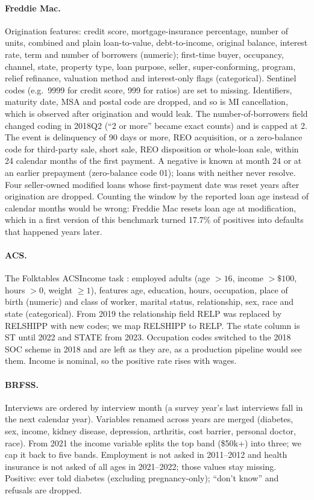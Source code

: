 \documentclass[11pt]{article}
\begin{document}
\paragraph{Freddie Mac.} Origination features: credit score, mortgage-insurance percentage, number
of units, combined and plain loan-to-value, debt-to-income, original balance, interest rate, term
and number of borrowers (numeric); first-time buyer, occupancy, channel, state, property type,
loan purpose, seller, super-conforming, program, relief refinance, valuation method and
interest-only flags (categorical). Sentinel codes (e.g.\ 9999 for credit score, 999 for ratios) are
set to missing. Identifiers, maturity date, MSA and postal code are dropped, and so is MI
cancellation, which is observed after origination and would leak. The number-of-borrowers field
changed coding in 2018Q2 (``2 or more'' became exact counts) and is capped at 2. The event is
delinquency of 90 days or more, REO acquisition, or a zero-balance code for third-party sale,
short sale, REO disposition or whole-loan sale, within 24 calendar months of the first payment.
A negative is known at month 24 or at an earlier prepayment (zero-balance code 01); loans with
neither never resolve. Four seller-owned modified loans whose first-payment date was reset years
after origination are dropped. Counting the window by the reported loan age instead of calendar
months would be wrong: Freddie Mac resets loan age at modification, which in a first version of
this benchmark turned 17.7\% of positives into defaults that happened years later.

\paragraph{ACS.} The Folktables ACSIncome task \citep{ding2021folktables}: employed adults (age
$> 16$, income $> \$100$, hours $> 0$, weight $\ge 1$), features age, education, hours, occupation,
place of birth (numeric) and class of worker, marital status, relationship, sex, race and state
(categorical). From 2019 the relationship field RELP was replaced by RELSHIPP with new codes; we map
RELSHIPP to RELP. The state column is ST until 2022 and STATE from 2023. Occupation codes switched to
the 2018 SOC scheme in 2018 and are left as they are, as a production pipeline would see them.
Income is nominal, so the positive rate rises with wages.

\paragraph{BRFSS.} Interviews are ordered by interview month (a survey year's last interviews fall
in the next calendar year). Variables renamed across years are merged (diabetes, sex, income,
kidney disease, depression, arthritis, cost barrier, personal doctor, race). From 2021 the income
variable splits the top band (\$50k+) into three; we cap it back to five bands. Employment is not
asked in 2011--2012 and health insurance is not asked of all ages in 2021--2022; those values stay
missing. Positive: ever told diabetes (excluding pregnancy-only); ``don't know'' and refusals are
dropped.
\end{document}
